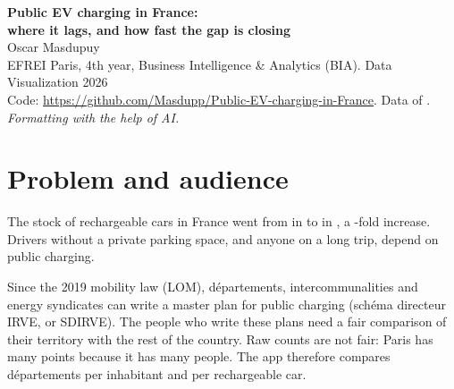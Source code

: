 \documentclass[11pt]{article}
\begin{document}
\begin{center}
{\LARGE\bfseries\color{deep} Public EV charging in France:\\[2pt] where it lags, and how fast the gap is closing}\\[8pt]
{\large Oscar Masdupuy}\\[2pt]
{\color{muted}EFREI Paris, 4th year, Business Intelligence \& Analytics (BIA). Data Visualization 2026}\\[2pt]
{\color{muted}Code: \url{https://github.com/Masdupp/Public-EV-charging-in-France}. Data of \nBuildDate.}\\[2pt]
{\small\itshape Formatting with the help of AI.}
\end{center}

\vspace{4pt}
\noindent{}

\section{Problem and audience}

The stock of rechargeable cars in France went from \nEvFirst{} in \nEvFirstDate{} to \nEvLast{} in \nEvLastDate, a \nEvFold-fold increase. Drivers without a private parking space, and anyone on a long trip, depend on public charging.

Since the 2019 mobility law (LOM), départements, intercommunalities and energy syndicates can write a master plan for public charging (schéma directeur IRVE, or SDIRVE). The people who write these plans need a fair comparison of their territory with the rest of the country. Raw counts are not fair: Paris has many points because it has many people. The app therefore compares départements per inhabitant and per rechargeable car.
\end{document}
